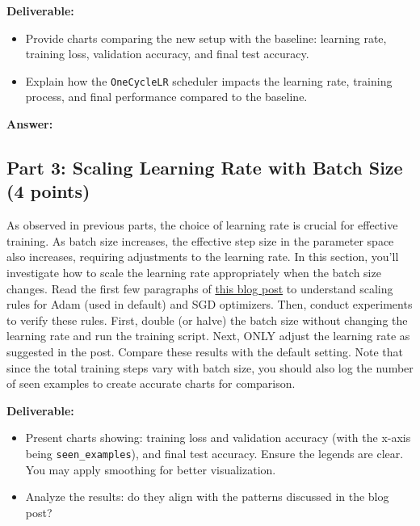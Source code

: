 \documentclass[11pt, oneside]{article}   	%
\begin{document}
\noindent\textbf{Deliverable:}
\begin{itemize}
    \item Provide charts comparing the new setup with the baseline: learning rate, training loss, validation accuracy, and final test accuracy.
    \item Explain how the \texttt{OneCycleLR} scheduler impacts the learning rate, training process, and final performance compared to the baseline.
\end{itemize}

\begin{answerbox} \textbf{Answer:} \vspace*{1cm}

\end{answerbox}



\subsection*{Part 3: Scaling Learning Rate with Batch Size (4 points)}

As observed in previous parts, the choice of learning rate is crucial for effective training. As batch size increases, the effective step size in the parameter space also increases, requiring adjustments to the learning rate. In this section, you'll investigate how to scale the learning rate appropriately when the batch size changes. Read the first few paragraphs of \href{https://www.cs.princeton.edu/~smalladi/blog/2024/01/22/SDEs-ScalingRules/}{this blog post} to understand scaling rules for Adam (used in default) and SGD optimizers. Then, conduct experiments to verify these rules. First, double (or halve) the batch size without changing the learning rate and run the training script. Next, ONLY adjust the learning rate as suggested in the post. Compare these results with the default setting. Note that since the total training steps vary with batch size, you should also log the number of seen examples to create accurate charts for comparison.


\noindent\textbf{Deliverable:}
\begin{itemize}
    \item Present charts showing: training loss and validation accuracy (with the x-axis being \texttt{seen\_examples}), and final test accuracy. Ensure the legends are clear. You may apply smoothing for better visualization. 
    \item Analyze the results: do they align with the patterns discussed in the blog post?
\end{itemize}
\end{document}
